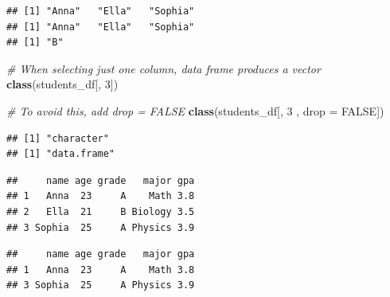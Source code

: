\documentclass[
]{book}
\newenvironment{Shaded}{\begin{snugshade}}{\end{snugshade}}
\newcommand{\AttributeTok}[1]{\textcolor[rgb]{0.13,0.29,0.53}{#1}}
\newcommand{\CommentTok}[1]{\textcolor[rgb]{0.56,0.35,0.01}{\textit{#1}}}
\newcommand{\ConstantTok}[1]{\textcolor[rgb]{0.56,0.35,0.01}{#1}}
\newcommand{\DecValTok}[1]{\textcolor[rgb]{0.00,0.00,0.81}{#1}}
\newcommand{\FloatTok}[1]{\textcolor[rgb]{0.00,0.00,0.81}{#1}}
\newcommand{\FunctionTok}[1]{\textcolor[rgb]{0.13,0.29,0.53}{\textbf{#1}}}
\newcommand{\NormalTok}[1]{#1}
\newcommand{\OtherTok}[1]{\textcolor[rgb]{0.56,0.35,0.01}{#1}}
\newcommand{\SpecialCharTok}[1]{\textcolor[rgb]{0.81,0.36,0.00}{\textbf{#1}}}
\begin{document}
\begin{verbatim}
## [1] "Anna"   "Ella"   "Sophia"
## [1] "Anna"   "Ella"   "Sophia"
## [1] "B"
\end{verbatim}

\begin{Shaded}
\begin{Highlighting}[]
\CommentTok{\# When selecting just one column, data frame produces a vector}
\FunctionTok{class}\NormalTok{(students\_df[, }\DecValTok{3}\NormalTok{])}

\CommentTok{\# To avoid this, add drop = FALSE}
\FunctionTok{class}\NormalTok{(students\_df[, }\DecValTok{3}\NormalTok{ , }\AttributeTok{drop =} \ConstantTok{FALSE}\NormalTok{])}
\end{Highlighting}
\end{Shaded}

\begin{verbatim}
## [1] "character"
## [1] "data.frame"
\end{verbatim}

\begin{Shaded}
\end{Shaded}

\begin{verbatim}
##     name age grade   major gpa
## 1   Anna  23     A    Math 3.8
## 2   Ella  21     B Biology 3.5
## 3 Sophia  25     A Physics 3.9
\end{verbatim}

\begin{Shaded}
\end{Shaded}

\begin{verbatim}
##     name age grade   major gpa
## 1   Anna  23     A    Math 3.8
## 3 Sophia  25     A Physics 3.9
\end{verbatim}
\end{document}
